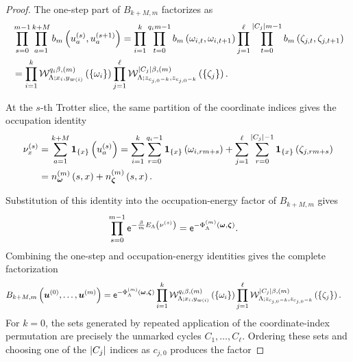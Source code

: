 \documentclass[11pt,a4paper]{article}
\theoremstyle{plain}
\theoremstyle{definition}
\theoremstyle{remark}
\begin{document}
\begin{proof}
The one-step part of $B_{k+M,m}$ factorizes as
$$\begin{aligned}
&
\prod_{s = 0}^{m-1}
\prod_{a = 1}^{k+M}
\fun{b_m}{u_a^{(s)},u_a^{(s+1)}}
=
\prod_{i = 1}^{k}
\prod_{t = 0}^{q_i m-1}
\fun{b_m}{\omega_{i,t},\omega_{i,t+1}}
\prod_{j = 1}^{\ell}
\prod_{t = 0}^{\abscard{C_j}m-1}
\fun{b_m}{\zeta_{j,t},\zeta_{j,t+1}}
\\ %
& =
\prod_{i = 1}^{k}
\fun{\msrcal{W}_{\Lambda;x_i,y_{\fun{\varpi}{i}}}^{q_i\beta,(m)}}{\setone{\omega_i}}
\prod_{j = 1}^{\ell}
\fun{\msrcal{W}_{\Lambda;z_{c_{j,0}-k},z_{c_{j,0}-k}}^{\abscard{C_j}\beta,(m)}}{\setone{\zeta_j}}.
\end{aligned}$$
\begin{samepage}
At the $s$-th Trotter slice, the same partition of the coordinate indices gives the occupation identity
$$\begin{aligned}
\nu_x^{(s)}
& =
\sum_{a = 1}^{k+M}
\boldsymbol{1}_{\left\{ x \right\}} \left( u_a^{(s)} \right)
=
\sum_{i = 1}^{k}
\sum_{r = 0}^{q_i-1}
\boldsymbol{1}_{\left\{ x \right\}} \left( \omega_{i,rm+s} \right)
+
\sum_{j = 1}^{\ell}
\sum_{r = 0}^{\left| C_j \right|-1}
\boldsymbol{1}_{\left\{ x \right\}} \left( \zeta_{j,rm+s} \right)
\\
& =
n_{\boldsymbol{\omega}}^{(m)} \left( s,x \right)
+
n_{\boldsymbol{\zeta}}^{(m)} \left( s,x \right).
\end{aligned}$$
\end{samepage}
Substitution of this identity into the occupation-energy factor of $B_{k+M,m}$ gives
$$\begin{aligned}
\prod_{s = 0}^{m-1}
\napiernum^{-\frac{\sminvtemperature}{m}\fun{E_{\Lambda}}{\nu^{(s)}}}
& =
\napiernum^{-\fun{\Phi_{\Lambda}^{(m)}}{\boldsymbol{\omega},\boldsymbol{\zeta}}}.
\end{aligned}$$
Combining the one-step and occupation-energy identities gives the complete factorization
$$\begin{aligned}
B_{k+M,m} \left( \boldsymbol{u}^{(0)},\ldots,\boldsymbol{u}^{(m)} \right)
& =
\mathsf{e}^{-\Phi_{\Lambda}^{(m)} \left( \boldsymbol{\omega},\boldsymbol{\zeta} \right)}
\prod_{i = 1}^{k}
\mathcal{W}_{\Lambda;x_i,y_{\varpi \left( i \right)}}^{q_i\beta,(m)} \left( \left\{ \omega_i \right\} \right)
\prod_{j = 1}^{\ell}
\mathcal{W}_{\Lambda;z_{c_{j,0}-k},z_{c_{j,0}-k}}^{\left| C_j \right|\beta,(m)} \left( \left\{ \zeta_j \right\} \right).
\end{aligned}$$
For $k=0$, the sets generated by repeated application of the coordinate-index permutation are precisely the
unmarked cycles $C_1,\ldots,C_{\ell}$.
Ordering these sets and choosing one of the $\left| C_j \right|$ indices as $c_{j,0}$ produces the factor

\end{proof}
\end{document}
